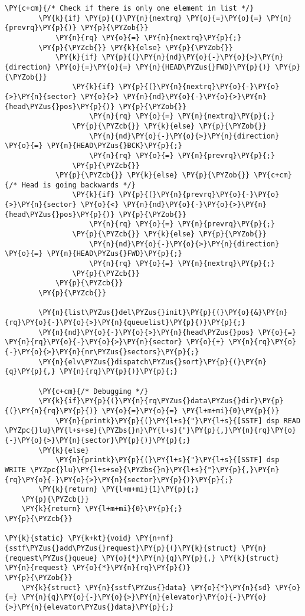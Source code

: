 \begin{Verbatim}[commandchars=\\\{\}]
		\PY{c+cm}{/* Check if there is only one element in list */}
		\PY{k}{if} \PY{p}{(}\PY{n}{nextrq} \PY{o}{=}\PY{o}{=} \PY{n}{prevrq}\PY{p}{)} \PY{p}{\PYZob{}}
			\PY{n}{rq} \PY{o}{=} \PY{n}{nextrq}\PY{p}{;}
		\PY{p}{\PYZcb{}} \PY{k}{else} \PY{p}{\PYZob{}}
			\PY{k}{if} \PY{p}{(}\PY{n}{nd}\PY{o}{-}\PY{o}{>}\PY{n}{direction} \PY{o}{=}\PY{o}{=} \PY{n}{HEAD\PYZus{}FWD}\PY{p}{)} \PY{p}{\PYZob{}}
				\PY{k}{if} \PY{p}{(}\PY{n}{nextrq}\PY{o}{-}\PY{o}{>}\PY{n}{sector} \PY{o}{>} \PY{n}{nd}\PY{o}{-}\PY{o}{>}\PY{n}{head\PYZus{}pos}\PY{p}{)} \PY{p}{\PYZob{}}
					\PY{n}{rq} \PY{o}{=} \PY{n}{nextrq}\PY{p}{;}
				\PY{p}{\PYZcb{}} \PY{k}{else} \PY{p}{\PYZob{}}
					\PY{n}{nd}\PY{o}{-}\PY{o}{>}\PY{n}{direction} \PY{o}{=} \PY{n}{HEAD\PYZus{}BCK}\PY{p}{;}
					\PY{n}{rq} \PY{o}{=} \PY{n}{prevrq}\PY{p}{;}
				\PY{p}{\PYZcb{}}
			\PY{p}{\PYZcb{}} \PY{k}{else} \PY{p}{\PYZob{}} \PY{c+cm}{/* Head is going backwards */}
				\PY{k}{if} \PY{p}{(}\PY{n}{prevrq}\PY{o}{-}\PY{o}{>}\PY{n}{sector} \PY{o}{<} \PY{n}{nd}\PY{o}{-}\PY{o}{>}\PY{n}{head\PYZus{}pos}\PY{p}{)} \PY{p}{\PYZob{}}
					\PY{n}{rq} \PY{o}{=} \PY{n}{prevrq}\PY{p}{;}
				\PY{p}{\PYZcb{}} \PY{k}{else} \PY{p}{\PYZob{}}
					\PY{n}{nd}\PY{o}{-}\PY{o}{>}\PY{n}{direction} \PY{o}{=} \PY{n}{HEAD\PYZus{}FWD}\PY{p}{;}
					\PY{n}{rq} \PY{o}{=} \PY{n}{nextrq}\PY{p}{;}
				\PY{p}{\PYZcb{}}
			\PY{p}{\PYZcb{}}
		\PY{p}{\PYZcb{}}

		\PY{n}{list\PYZus{}del\PYZus{}init}\PY{p}{(}\PY{o}{&}\PY{n}{rq}\PY{o}{-}\PY{o}{>}\PY{n}{queuelist}\PY{p}{)}\PY{p}{;}
		\PY{n}{nd}\PY{o}{-}\PY{o}{>}\PY{n}{head\PYZus{}pos} \PY{o}{=} \PY{n}{rq}\PY{o}{-}\PY{o}{>}\PY{n}{sector} \PY{o}{+} \PY{n}{rq}\PY{o}{-}\PY{o}{>}\PY{n}{nr\PYZus{}sectors}\PY{p}{;}
		\PY{n}{elv\PYZus{}dispatch\PYZus{}sort}\PY{p}{(}\PY{n}{q}\PY{p}{,} \PY{n}{rq}\PY{p}{)}\PY{p}{;}

		\PY{c+cm}{/* Debugging */}
		\PY{k}{if}\PY{p}{(}\PY{n}{rq\PYZus{}data\PYZus{}dir}\PY{p}{(}\PY{n}{rq}\PY{p}{)} \PY{o}{=}\PY{o}{=} \PY{l+m+mi}{0}\PY{p}{)}
			\PY{n}{printk}\PY{p}{(}\PY{l+s}{"}\PY{l+s}{[SSTF] dsp READ \PYZpc{}lu}\PY{l+s+se}{\PYZbs{}n}\PY{l+s}{"}\PY{p}{,}\PY{n}{rq}\PY{o}{-}\PY{o}{>}\PY{n}{sector}\PY{p}{)}\PY{p}{;}
		\PY{k}{else}
			\PY{n}{printk}\PY{p}{(}\PY{l+s}{"}\PY{l+s}{[SSTF] dsp WRITE \PYZpc{}lu}\PY{l+s+se}{\PYZbs{}n}\PY{l+s}{"}\PY{p}{,}\PY{n}{rq}\PY{o}{-}\PY{o}{>}\PY{n}{sector}\PY{p}{)}\PY{p}{;}
		\PY{k}{return} \PY{l+m+mi}{1}\PY{p}{;}
	\PY{p}{\PYZcb{}}
	\PY{k}{return} \PY{l+m+mi}{0}\PY{p}{;}
\PY{p}{\PYZcb{}}

\PY{k}{static} \PY{k+kt}{void} \PY{n+nf}{sstf\PYZus{}add\PYZus{}request}\PY{p}{(}\PY{k}{struct} \PY{n}{request\PYZus{}queue} \PY{o}{*}\PY{n}{q}\PY{p}{,} \PY{k}{struct} \PY{n}{request} \PY{o}{*}\PY{n}{rq}\PY{p}{)}
\PY{p}{\PYZob{}}
	\PY{k}{struct} \PY{n}{sstf\PYZus{}data} \PY{o}{*}\PY{n}{sd} \PY{o}{=} \PY{n}{q}\PY{o}{-}\PY{o}{>}\PY{n}{elevator}\PY{o}{-}\PY{o}{>}\PY{n}{elevator\PYZus{}data}\PY{p}{;}


\end{Verbatim}
